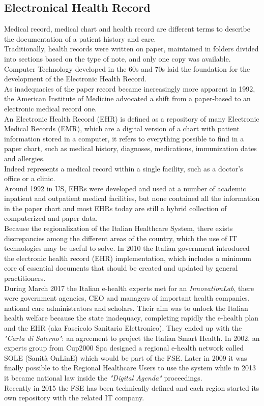\subsection{Electronical Health Record}
\label{subsection:electronic_health_record}
Medical record, medical chart and health record are different terms to describe the documentation of a patient history and care.\\
Traditionally, health records were written on paper, maintained in folders divided into sections based on the type of note, and only one copy was available.
Computer Technology developed in the 60s and 70s laid the foundation for the development of the Electronic Health Record.\\
As inadequacies of the paper record became increasingly more apparent in 1992, the American Institute of Medicine advocated a shift from a paper-based to an electronic medical record one.\cite{Evans2016ElectronicHR}\\
An Electronic Health Record (EHR) is defined as a repository of many Electronic Medical Records (EMR), which are a digital version of a chart with patient information stored in a computer, it refers to everything possible to find in a paper chart, such as medical history, diagnoses, medications, immunization dates and allergies.\cite{emr}\\
Indeed represents a medical record within a single facility, such as a doctor's office or a clinic.\\
Around 1992 in US, EHRs were developed and used at a number of academic inpatient and outpatient medical facilities, but none contained all the information in the paper chart and most EHRs today are still a hybrid collection of computerized and paper data.
\cite{Evans2016ElectronicHR}\\
Because the regionalization of the Italian Healthcare System, there exists discrepancies among the different areas of the country, which the use of IT technologies may be useful to solve. In 2010 the Italian government introduced the electronic health record (EHR) implementation, which includes a minimum core of essential documents that should be created and updated by general practitioners.\\
During March 2017 the Italian e-health experts met for an \textit{InnovationLab}, there were government agencies, CEO and managers of important health companies, national care administrators and scholars. Their aim was to unlock the Italian health welfare because the state inadequacy, completing rapidly the e-health plan and the EHR (aka Fascicolo Sanitario Elettronico). They ended up with the \textit{"Carta di Salerno"}: an agreement to project the Italian Smart Health.
In 2002, an experts group from Cup2000 Spa designed a regional e-health network called SOLE (Sanità OnLinE) which would be part of the FSE. Later in 2009 it was finally possible to the Regional Healthcare Users to use the system while in 2013 it became national law inside the \textit{"Digital Agenda"} proceedings.\\
Recently in 2015 the FSE has been technically defined and each region started its own repository with the related IT company.
\cite{smarthealth}
